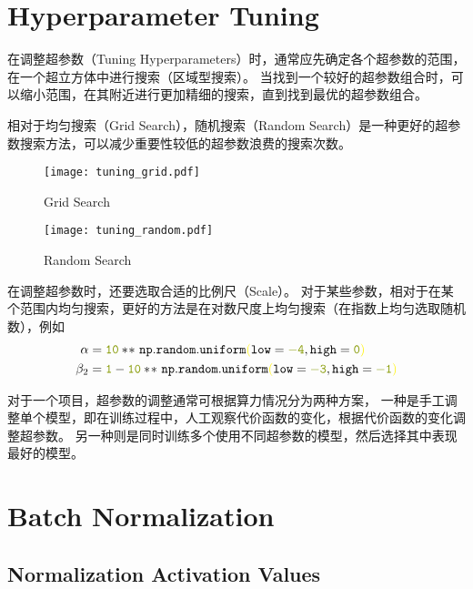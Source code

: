 \section{Hyperparameter Tuning}

在调整超参数（Tuning Hyperparameters）时，通常应先确定各个超参数的范围，在一个超立方体中进行搜索（区域型搜索）。
当找到一个较好的超参数组合时，可以缩小范围，在其附近进行更加精细的搜索，直到找到最优的超参数组合。

相对于均匀搜索（Grid Search），随机搜索（Random Search）是一种更好的超参数搜索方法，可以减少重要性较低的超参数浪费的搜索次数。
\begin{figure}[h!bt]
    \centering
    \begin{minipage}[t]{0.45\textwidth}
        \centering
        \texttt{[image: tuning\_grid.pdf]}
        \caption{Grid Search}
    \end{minipage}
    \begin{minipage}[t]{0.45\textwidth}
        \centering
        \texttt{[image: tuning\_random.pdf]}
        \caption{Random Search}
    \end{minipage}
\end{figure}

在调整超参数时，还要选取合适的比例尺（Scale）。
对于某些参数，相对于在某个范围内均匀搜索，更好的方法是在对数尺度上均匀搜索（在指数上均匀选取随机数），例如
\begin{align}
    \alpha &= \mathtt{\textcolor{green}{10} *\!* \ np.random.uniform\textcolor{yellow}{(}low=\textcolor{green}{-4}, high=\textcolor{green}{0}\textcolor{yellow}{)}} \\
    \beta_2 &= \mathtt{\textcolor{green}{1} - \textcolor{green}{10} *\!* \ np.random.uniform\textcolor{yellow}{(}low=\textcolor{green}{-3}, high=\textcolor{green}{-1}\textcolor{yellow}{)}}
\end{align}

对于一个项目，超参数的调整通常可根据算力情况分为两种方案，
一种是手工调整单个模型，即在训练过程中，人工观察代价函数的变化，根据代价函数的变化调整超参数。
另一种则是同时训练多个使用不同超参数的模型，然后选择其中表现最好的模型。

\section{Batch Normalization}

\subsection{Normalization Activation Values}

